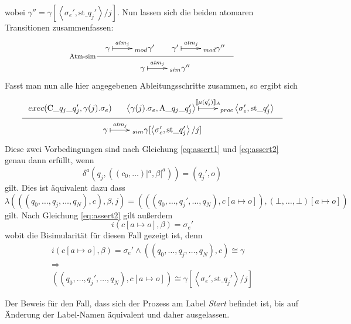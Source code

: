 wobei $\gamma'' = \gamma[\left<\sigma_e',\textrm{st\_}q_j'\right>/j]$.
Nun lassen sich die beiden atomaren Transitionen zusammenfassen:
\[
\inference[Atm-sim]{
  \xymatrix{ \gamma \ar@{|->}[r]^-{\mathit{atm}_j} & _{mod}
    \gamma'
  } &
  \xymatrix{ \gamma'\ar@{|->}[r]^-{\mathit{atm}_j} & _{mod}
    \gamma''
  }
}{
  \xymatrix{ \gamma \ar@{|->}[r]^-{\mathit{atm}_j} & _{sim}
    \gamma''
  }
}
\]
Fasst man nun alle hier angegebenen Ableitungsschritte zusammen, so ergibt sich
\[
\inference{
  exec(\textrm{C\_}q_j\textrm{\_}q_j',\gamma(j).\sigma_e) &
  \xymatrix{ \left<\gamma(j).\sigma_e,\textrm{A\_}q_j\textrm{\_}q_j'\right> \ar@{|->}[r]^-{\llbracket \mu(q_j')\rrbracket_A} & _{proc}
    \left<\sigma_e',\textrm{st\_}q_j'\right> }
}{
  \xymatrix{ \gamma \ar@{|->}[r]^-{\mathit{atm}_j} & _{sim}
    \gamma[\left<\sigma_e',\textrm{st\_}q_j'\right>/j]
  }
}
\]
Diese zwei Vorbedingungen sind nach Gleichung \ref{eq:assert1} und \ref{eq:assert2} genau dann erfüllt, wenn
\[ \delta^a(q_j,((c_0,\dots)|^a,\beta|^a)) = (q_j',o) \]
gilt.
Dies ist äquivalent dazu dass
\[ \lambda(((q_0,\dots,q_j,\dots,q_N),c),\beta,j) = (((q_0,\dots,q_j',\dots,q_N),c[a\mapsto o]),(\bot,\dots,\bot)[a\mapsto o]) \]
gilt.
Nach Gleichung \ref{eq:assert2} gilt außerdem
\[ i(c[a\mapsto o],\beta) = \sigma_e' \]
wobit die Bisimularität für diesen Fall gezeigt ist, denn
\[
\begin{array}{c}
  i(c[a\mapsto o],\beta) = \sigma_e' \land ((q_0,\dots,q_j,\dots,q_N),c)\cong\gamma\\
  \Rightarrow\\
  ((q_0,\dots,q_j',\dots,q_N),c[a\mapsto o])\cong \gamma[\left<\sigma_e',\textrm{st\_}q_j'\right>/j]
\end{array}
\]

Der Beweis für den Fall, dass sich der Prozess am Label \emph{Start} befindet ist, bis auf Änderung der Label-Namen äquivalent und daher ausgelassen.
